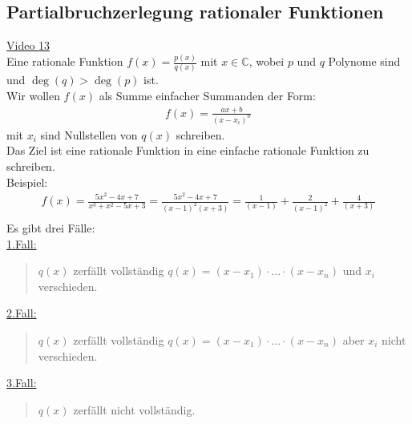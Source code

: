 \subsection{Partialbruchzerlegung rationaler Funktionen}
\href{https://youtu.be/imQZqfJI8yI}{Video 13}\\
Eine rationale Funktion $ f(x)=\frac{p(x)}{q(x)} $ mit $ x\in \mathbb{C} $, wobei $ p $ und $ q $ Polynome sind und  $ \deg(q)>\deg(p) $  ist.\\
Wir wollen $ f(x) $ als Summe einfacher Summanden der Form:\\
\begin{align*}
f(x)=\frac{ax+b}{(x-x_i)^n}
\end{align*}
mit $ x_i $ sind Nullstellen von $ q(x) $ schreiben.\\
Das Ziel ist eine rationale Funktion in eine einfache rationale Funktion zu schreiben.\vspace*{2mm}\\
Beispiel:\\
\begin{align*}
f(x)=\frac{5x^2-4x+7}{x^3+x^2-5x+3}=\frac{5x^2-4x+7}{(x-1)^2(x+3)}=\frac{1}{(x-1)}+\frac{2}{(x-1)^2}+\frac{4}{(x+3)}\\
\end{align*}
Es gibt drei Fälle:\\
\underline{1.Fall:}\\
\begin{quote}
	$ q(x) $ zerfällt vollständig $ q(x)=(x-x_1)\cdot\ldots\cdot(x-x_n) $ und $ x_i $ verschieden.\\
\end{quote}
\underline{2.Fall:}\\
\begin{quote}
	$ q(x) $ zerfällt vollständig $ q(x)=(x-x_1)\cdot\ldots\cdot(x-x_n) $ aber $ x_i $ nicht verschieden.\\
\end{quote}
\underline{3.Fall:}\\
\begin{quote}
	$ q(x) $ zerfällt nicht vollständig. \\
\end{quote}
